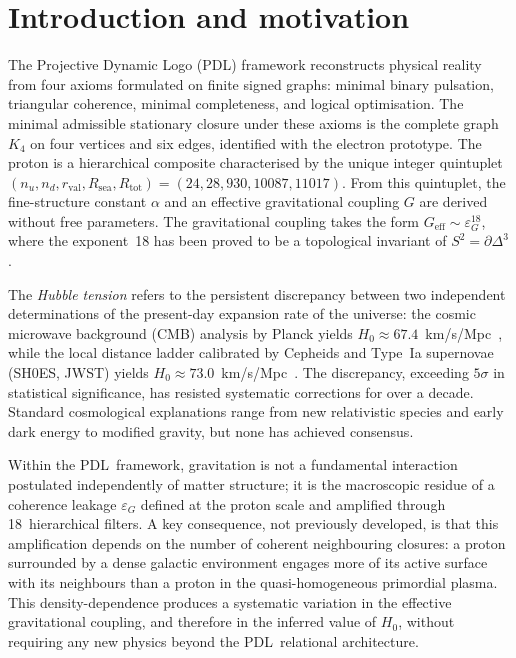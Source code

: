 \documentclass[11pt,a4paper]{article}
\theoremstyle{definition}
\newcommand{\PDL}{\textnormal{PDL}}
\newcommand{\Rsea}{R_{\mathrm{sea}}}
\newcommand{\Rtot}{R_{\mathrm{tot}}}
\newcommand{\rval}{r_{\mathrm{val}}}
\newcommand{\epsg}{\varepsilon_G}
\newcommand{\Kfour}{K_4}
\newcommand{\Sfour}{\partial\Delta^3}
\newcommand{\Geff}{G_{\mathrm{eff}}}
\newcommand{\Hzero}{H_0}
\begin{document}
\section{Introduction and motivation}
\label{sec:intro}

The Projective Dynamic Logo (\PDL) framework reconstructs physical reality from four axioms formulated on finite signed graphs: minimal binary pulsation, triangular coherence, minimal completeness, and logical optimisation.\cite{PDL_Main_2026,PDL_Intro_2026} The minimal admissible stationary closure under these axioms is the complete graph $\Kfour$ on four vertices and six edges, identified with the electron prototype.\cite{PDL_Main_2026} The proton is a hierarchical composite characterised by the unique integer quintuplet $(n_u, n_d, \rval, \Rsea, \Rtot) = (24, 28, 930, 10087, 11017)$.\cite{Combinatorial_Proton_v2_2026} From this quintuplet, the fine-structure constant $\alpha$ and an effective gravitational coupling $G$ are derived without free parameters.\cite{Alpha_PDL_v2_2026,Bridge_Formula_PDL_2026} The gravitational coupling takes the form $\Geff \sim \epsg^{18}$, where the exponent~18 has been proved to be a topological invariant of $S^2 = \Sfour$.\cite{Topology_18_PDL_2026}

The \emph{Hubble tension} refers to the persistent discrepancy between two independent determinations of the present-day expansion rate of the universe: the cosmic microwave background (CMB) analysis by Planck yields $\Hzero \approx 67.4$~km/s/Mpc~\cite{Planck_2020}, while the local distance ladder calibrated by Cepheids and Type~Ia supernovae (SH0ES, JWST) yields $\Hzero \approx 73.0$~km/s/Mpc~\cite{Riess_2022,Freedman_2024}. The discrepancy, exceeding $5\sigma$ in statistical significance, has resisted systematic corrections for over a decade.\cite{DiValentino_2021} Standard cosmological explanations range from new relativistic species and early dark energy to modified gravity, but none has achieved consensus.\cite{Knox_Millea_2020}

Within the \PDL\ framework, gravitation is not a fundamental interaction postulated independently of matter structure; it is the macroscopic residue of a coherence leakage $\epsg$ defined at the proton scale and amplified through 18~hierarchical filters.\cite{Exponent_18_PDL_2026} A key consequence, not previously developed, is that this amplification depends on the number of coherent neighbouring closures: a proton surrounded by a dense galactic environment engages more of its active surface with its neighbours than a proton in the quasi-homogeneous primordial plasma. This density-dependence produces a systematic variation in the effective gravitational coupling, and therefore in the inferred value of $\Hzero$, without requiring any new physics beyond the \PDL\ relational architecture.
\end{document}
